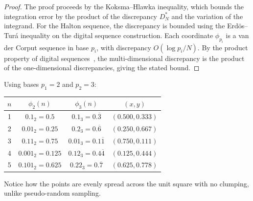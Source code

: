 \begin{proof}
The proof proceeds by the Koksma--Hlawka inequality, which bounds the integration error by the product of the discrepancy $D_N^*$ and the variation of the integrand. For the Halton sequence, the discrepancy is bounded using the Erd\"{o}s--Tur\'{a} inequality on the digital sequence construction. Each coordinate $\phi_{p_i}$ is a van der Corput sequence in base $p_i$, with discrepancy $O(\log p_i / N)$. By the product property of digital sequences~\cite{niederreiter1992}, the multi-dimensional discrepancy is the product of the one-dimensional discrepancies, giving the stated bound.
\end{proof}

\begin{example}\label{ex:halton_2d}
Using bases $p_1 = 2$ and $p_2 = 3$:

\begin{center}
\begin{tabular}{cccc}
\toprule
$n$ & $\phi_2(n)$ & $\phi_3(n)$ & $(x, y)$ \\
\midrule
1 & $0.1_2 = 0.5$ & $0.1_3 = 0.\overline{3}$ & $(0.500, 0.333)$ \\
2 & $0.01_2 = 0.25$ & $0.2_3 = 0.\overline{6}$ & $(0.250, 0.667)$ \\
3 & $0.11_2 = 0.75$ & $0.01_3 = 0.1\overline{1}$ & $(0.750, 0.111)$ \\
4 & $0.001_2 = 0.125$ & $0.12_3 = 0.4\overline{4}$ & $(0.125, 0.444)$ \\
5 & $0.101_2 = 0.625$ & $0.22_3 = 0.\overline{7}$ & $(0.625, 0.778)$ \\
\bottomrule
\end{tabular}
\end{center}
Notice how the points are evenly spread across the unit square with no clumping, unlike pseudo-random sampling.
\end{example}

